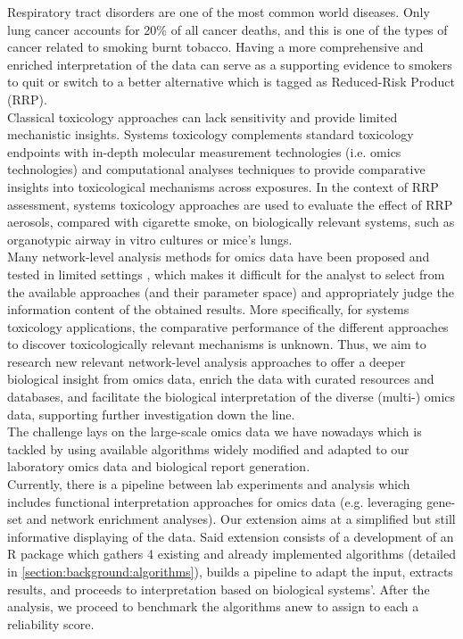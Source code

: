 Respiratory tract disorders are one of the most common world diseases. Only lung cancer accounts for 20\% of all cancer deaths, and this is one of the types of cancer related to smoking burnt tobacco. Having a more comprehensive and enriched interpretation of the data can serve as a supporting evidence to smokers to quit or switch to a better alternative which is tagged as Reduced-Risk Product (RRP). 
\\

Classical toxicology  approaches can lack sensitivity and provide limited mechanistic insights. Systems toxicology \cite{Sturla2014SystemsAssessment} complements standard toxicology endpoints with in-depth molecular measurement technologies (i.e. omics technologies) and computational analyses techniques to provide comparative insights into toxicological mechanisms across exposures. In the context of RRP assessment, systems toxicology approaches are used to evaluate the effect of RRP aerosols, compared with cigarette smoke, on biologically relevant systems, such as organotypic airway in vitro cultures or mice’s lungs.
\\

Many network-level analysis methods for omics data have been proposed and tested in limited settings \cite{Gwinner2017Network-basedMethod} \cite{Yan2017NetworkData} \cite{Dimitrakopoulos2018Network-basedGenes}, which makes it difficult for the analyst to select from the available approaches (and their parameter space) and appropriately judge the information content of the obtained results. More specifically, for systems toxicology applications, the comparative performance of the different approaches to discover toxicologically relevant mechanisms is unknown. Thus, we aim to research new relevant network-level analysis approaches to offer a deeper biological insight from omics data, enrich the data with curated resources and databases, and facilitate the biological interpretation of the diverse (multi-) omics data, supporting further investigation down the line.
\\

The challenge lays on the large-scale omics data we have nowadays which is tackled by using available algorithms widely modified and adapted to our laboratory omics data and biological report generation. 
\\

Currently, there is a pipeline between lab experiments and analysis which includes functional interpretation approaches for omics data (e.g. leveraging gene-set and network enrichment analyses). Our extension aims at a simplified but still informative displaying of the data. Said extension consists of a development of an R package which gathers 4 existing and already implemented algorithms (detailed in \ref{section:background:algorithms}), builds a pipeline to adapt the input, extracts results, and proceeds to interpretation based on biological systems’. After the analysis, we proceed to benchmark the algorithms anew to assign to each a reliability score.

